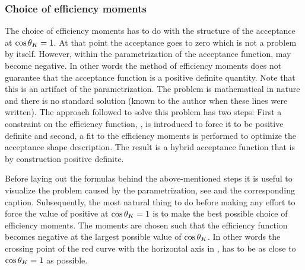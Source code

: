 \subsubsection{Choice of efficiency moments}
The choice of efficiency moments has to do with the structure of the acceptance at $\cos\theta_{K}=1$. At that point the acceptance goes to zero
which is not a problem by itself. However, within the parametrization of the acceptance function,  may become negative.
In other words the method of efficiency moments does not guarantee that the acceptance function is a positive definite quantity.
Note that this is an artifact of the parametrization. The problem is mathematical in nature and there is no standard solution (known
to the author when these lines were written). The approach followed to solve this problem has two steps: First a constraint on the
efficiency function, , is introduced to force it to be positive definite and second, a fit to the efficiency
moments is performed to optimize the acceptance shape description. The result is a hybrid acceptance function that is by
construction positive definite.

Before laying out the formulas behind the above-mentioned steps it is useful to visualize the problem caused by the parametrization, see 
and the corresponding caption. Subsequently, the most natural thing to do before making any effort to force the value of 
positive at $\cos\theta_{K}=1$ is to make the best possible choice of efficiency moments. The moments are chosen such that the efficiency function becomes negative
at the largest possible value of $\cos\theta_{K}$. In other words the crossing point of the red curve with the horizontal axis in ,
has to be as close to $\cos\theta_{K}=1$ as possible.

